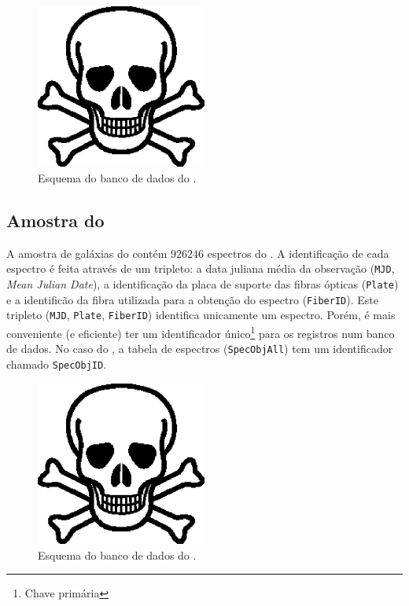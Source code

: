 \begin{figure}
	\includegraphics[width=0.5\textwidth]{figuras/test.eps}
	\caption[Esquema do banco de dados do \starlight.]
	{Esquema do banco de dados do \starlight.}
	\label{fig:EsquemaBDStarlight}
\end{figure}

\subsection{Amostra do \starlight}
\label{sec:Crossmatch:AmostraStarlight}
A amostra de galáxias do \starlight contém $926246$ espectros do \SDSS. A
identificação de cada espectro é feita através de um tripleto: a data juliana
média da observação ({\tt MJD}, {\em Mean Julian Date}), a identificação da
placa de suporte das fibras ópticas ({\tt Plate}) e a identificão da fibra
utilizada para a obtenção do espectro ({\tt FiberID}). Este tripleto ({\tt MJD},
{\tt Plate}, {\tt FiberID}) identifica unicamente um espectro. Porém, é mais
conveniente (e eficiente) ter um identificador único{\footnote{Chave primária
\fixme}} para os registros num banco de dados. No caso do \SDSS, a tabela de
espectros ({\tt SpecObjAll}) tem um identificador chamado {\tt SpecObjID}.

\begin{figure}
	\includegraphics[width=0.5\textwidth]{figuras/test.eps}
	\caption[Esquema do banco de dados do \SDSS.]
	{Esquema do banco de dados do \SDSS.}
	\label{fig:EsquemaSDSS}
\end{figure}

